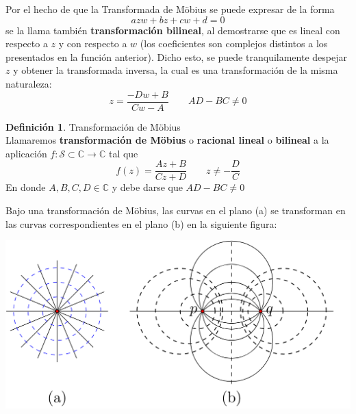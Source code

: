 \documentclass[12pt]{article}
\theoremstyle{definition}
\newtheorem{definition}{Definici\'on}[section]
\theoremstyle{theorem}
\theoremstyle{corolary}
\begin{document}
Por el hecho de que la Transformada de M\"obius se puede expresar de la forma $$azw + bz + cw+d =0$$ se la llama tambi\'en \textbf{transformaci\'on bilineal}, al demostrarse que es lineal con respecto a $z$ y con respecto a $w$ (los coeficientes son complejos distintos a los presentados en la funci\'on anterior). Dicho esto, se puede tranquilamente despejar $z$ y obtener la transformada inversa, la cual es una transformaci\'on de la misma naturaleza: $$z = \frac{-Dw+B}{Cw-A} \qquad AD-BC\neq0$$

\colorbox{green!40!white!80}{\parbox{\linewidth}{
 \theoremstyle{definition}
 \begin{definition}{Transformaci\'on de M\"obius}\\
  	Llamaremos \textbf{transformaci\'on de M\"obius} o \textbf{racional lineal} o \textbf{bilineal} a la aplicaci\'on $f: \mathcal{S} \subset \mathbb{C} \rightarrow \mathbb{C}$ tal que $$f(z) = \frac{Az+B}{Cz+D} \qquad z\neq -\frac{D}{C}$$
En donde $A,B,C,D \in \mathbb{C}$ y debe darse que $AD-BC\neq 0$
 \end{definition}}}
\linebreak
\linebreak

Bajo una transformaci\'on de M\"obius, las curvas en el plano (a) se transforman en las curvas correspondientes en el plano (b) en la siguiente figura:\\
\begin{center}
	\includegraphics[scale=0.4]{moebius_transformation.png}
\end{center}


\end{document}
